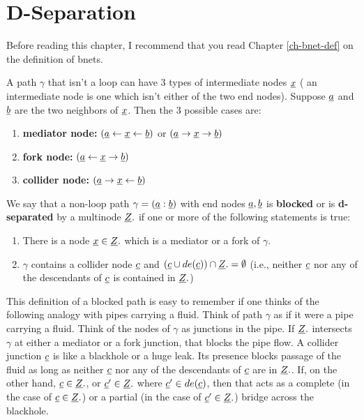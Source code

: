 \chapter{D-Separation}
\label{chap-dsep}
Before reading this chapter,
I  recommend
that you
read
Chapter \ref{ch-bnet-def}
on the definition of bnets.


A path $\gamma$ that
isn't a loop can have 
3 types of intermediate nodes ${\underline{x}}$ (
an intermediate node is one  which 
isn't either
of the two end nodes).
Suppose ${\underline{a}}$ and ${\underline{b}}$
are the two neighbors of ${\underline{x}}$. Then
the 3 possible cases are:
\begin{enumerate}
\item {\bf mediator node:}
$({\underline{a}}\leftarrow{\underline{x}}\leftarrow {\underline{b}})$
or
$({\underline{a}}\rightarrow{\underline{x}}\rightarrow {\underline{b}})$
\item {\bf fork node:}
$({\underline{a}}\leftarrow{\underline{x}}\rightarrow {\underline{b}})$
\item {\bf collider node:}
$({\underline{a}}\rightarrow{\underline{x}}\leftarrow {\underline{b}})$
\end{enumerate}

We say that a non-loop path 
$\gamma=
({\underline{a}}:{\underline{b}})$ with
end nodes ${\underline{a}}, {\underline{b}}$
is {\bf blocked} 
or is {\bf d-separated}
by a multinode ${\underline{Z}}.$
if one or more 
of the following
statements is true:

\begin{enumerate}
\item 
There is a node ${\underline{x}}\in {\underline{Z}}.$
which is a mediator 
or a fork of $\gamma$.
\item
$\gamma$ contains a collider
node ${\underline{c}}$
and 
$({\underline{c}}\cup de({\underline{c}}))\cap{\underline{Z}}.=\emptyset$
(i.e., neither 
${\underline{c}}$ nor 
any of the descendants of ${\underline{c}}$
is contained in ${\underline{Z}}.$)
\end{enumerate}

This definition of a blocked 
path is easy to remember
if one thinks 
of the following analogy
with pipes carrying a fluid.
Think of path
$\gamma$ as if it
were a pipe
carrying a fluid.
Think of
the nodes 
of $\gamma$ as junctions in the pipe.
If ${\underline{Z}}.$
intersects $\gamma$
at either a mediator
or a fork junction,
that blocks the pipe flow.
A collider junction ${\underline{c}}$
is like a blackhole 
or a huge leak.
Its presence
blocks passage
of the fluid
as long
as neither
${\underline{c}}$
nor any of
the descendants 
of ${\underline{c}}$
are in ${\underline{Z}}.$.
If,
on the 
other hand,
${\underline{c}}\in{\underline{Z}}.$,
or ${\underline{c}}'\in {\underline{Z}}.$
where ${\underline{c}}'\in de({\underline{c}})$,
then
that acts
as a complete
(in the case of ${\underline{c}}\in{\underline{Z}}.$)
or a partial 
(in the case of ${\underline{c}}'\in{\underline{Z}}.$)
bridge across the blackhole.

